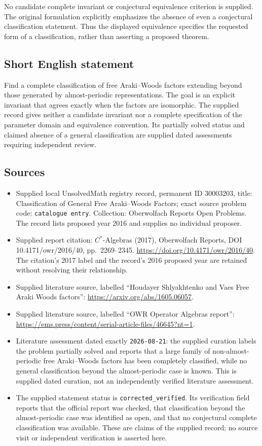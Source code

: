 \documentclass[11pt]{article}
\begin{document}
No candidate complete invariant or conjectural equivalence criterion is supplied. The original formulation explicitly emphasizes the absence of even a conjectural classification statement. Thus the displayed equivalence specifies the requested form of a classification, rather than asserting a proposed theorem.
\subsection{Short English statement}
Find a complete classification of free Araki--Woods factors extending beyond those generated by almost-periodic representations. The goal is an explicit invariant that agrees exactly when the factors are isomorphic. The supplied record gives neither a candidate invariant nor a complete specification of the parameter domain and equivalence convention. Its partially solved status and claimed absence of a general classification are supplied dated assessments requiring independent review.
\subsection{Sources}
\begin{itemize}
\item Supplied local UnsolvedMath registry record, permanent ID \(30003203\), title: Classification of General Free Araki--Woods Factors; exact source problem code: \texttt{catalogue entry}. Collection: Oberwolfach Reports Open Problems. The record lists proposed year 2016 and supplies no individual proposer.
\item Supplied report citation: \(C^*\)-Algebras (2017), Oberwolfach Reports, DOI 10.4171/owr/2016/40, pp.\ 2269--2345. \url{https://doi.org/10.4171/owr/2016/40}. The citation's 2017 label and the record's 2016 proposed year are retained without resolving their relationship.
\item Supplied literature source, labelled ``Houdayer Shlyakhtenko and Vaes Free Araki Woods factors'': \url{https://arxiv.org/abs/1605.06057}.
\item Supplied literature source, labelled ``OWR Operator Algebras report'': \url{https://ems.press/content/serial-article-files/46645?nt=1}.
\item Literature assessment dated exactly \texttt{2026-08-21}: the supplied curation labels the problem partially solved and reports that a large family of non-almost-periodic free Araki--Woods factors has been completely classified, while no general classification beyond the almost-periodic case is known. This is supplied dated curation, not an independently verified literature assessment.
\item The supplied statement status is \texttt{corrected\_verified}. Its verification field reports that the official report was checked, that classification beyond the almost-periodic case was identified as open, and that no conjectural complete classification was available. These are claims of the supplied record; no source visit or independent verification is asserted here.
\end{itemize}
\end{document}
